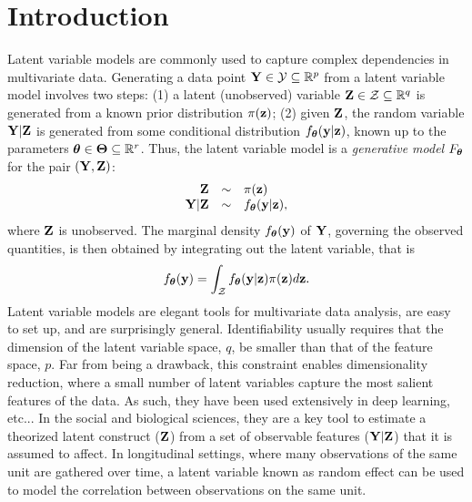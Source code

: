 \documentclass[twoside,11pt]{article}
\begin{document}
\section{Introduction}
 Latent variable models are commonly used to capture complex dependencies in multivariate data. Generating a data point ${\bf Y}\in \mathcal Y \subseteq \mathbb R^p$ from a latent variable model  involves two steps: (1) a latent (unobserved) variable ${\bf Z}\in \mathcal Z \subseteq\mathbb R^q$ is generated from a known prior distribution $\pi({\bf z})$; (2) given ${\bf Z}$, the random variable ${\bf Y}|{\bf Z}$ is generated from some conditional distribution $f_{\bm{\theta}}({\bf y}|{\bf z})$, known up to the parameters ${\bm{\theta}}\in\bm\Theta\subseteq \mathbb R^r$. Thus, the latent variable model is a \textit{generative model} $F_{\bm{\theta}}$ for the pair $({\bf Y}, {\bf Z})$:
%
\begin{align}
    \begin{matrix}
        \hfill\Z &\sim& \pi(\z)\hfill\\
        \hfill\Y|\Z &\sim& f_\bt(\y|\z)\hfill,
    \end{matrix}
    \label{eqn:generative-model-general}
\end{align}
%
where ${\bf Z}$ is unobserved.
% 
The marginal density $f_{\bm{\theta}}({\bf y})$ of ${\bf Y}$, governing the observed quantities, is then obtained by integrating out the latent variable, that is
%
\begin{equation}
    f_{\bm{\theta}}({\bf y}) = \int_{\mathcal Z} f_{\bm{\theta}}({\bf y}|{\bf z})\pi({\bf z})d{\bf z}.
\end{equation}
%
Latent variable models are elegant tools for multivariate data analysis, are easy to set up, and are surprisingly general. Identifiability usually requires that the dimension of the latent variable space, $q$, be smaller than that of the feature space, $p$. Far from being a drawback, this constraint enables dimensionality reduction, where a small number of latent variables capture the most salient features of the data. As such, they have been used extensively in deep learning, etc... In the social and biological sciences, they are a key tool to estimate a theorized latent construct (${\bf Z}$) from a set of observable features (${\bf Y}|{\bf Z}$) that it is assumed to affect. In longitudinal settings, where many observations of the same unit are gathered over time, a latent variable known as random effect can be used to model the correlation between observations on the same unit.
\end{document}
